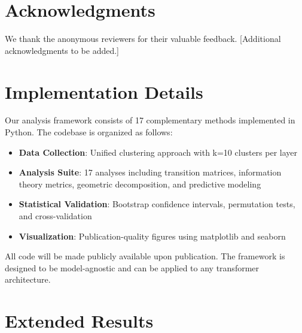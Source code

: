 \documentclass[11pt]{article}
\begin{document}












\section*{Acknowledgments}
We thank the anonymous reviewers for their valuable feedback. [Additional acknowledgments to be added.]




\appendix

\section{Implementation Details}
\label{sec:implementation}

Our analysis framework consists of 17 complementary methods implemented in Python. The codebase is organized as follows:

\begin{itemize}
\item \textbf{Data Collection}: Unified clustering approach with k=10 clusters per layer
\item \textbf{Analysis Suite}: 17 analyses including transition matrices, information theory metrics, geometric decomposition, and predictive modeling
\item \textbf{Statistical Validation}: Bootstrap confidence intervals, permutation tests, and cross-validation
\item \textbf{Visualization}: Publication-quality figures using matplotlib and seaborn
\end{itemize}

All code will be made publicly available upon publication. The framework is designed to be model-agnostic and can be applied to any transformer architecture.

\section{Extended Results}
\label{sec:extended}
\end{document}
